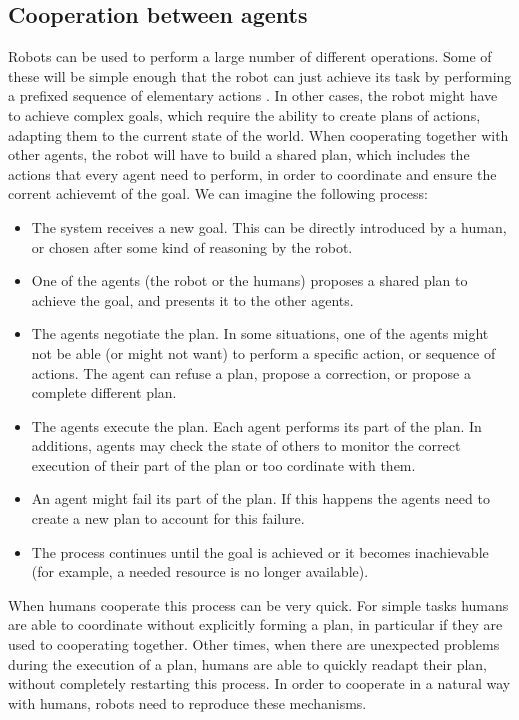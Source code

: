 \subsection{Cooperation between agents}
Robots can be used to perform a large number of different operations. Some of these will be simple enough that the robot can just achieve its task by performing a prefixed sequence of elementary actions . In other cases, the robot might have to  achieve complex goals, which require the ability to create plans of actions, adapting them to the current state of the world. When cooperating together with other agents, the robot will have to build a shared plan, which includes the actions that every agent need to perform, in order to coordinate and ensure the corrent achievemt of the goal. We can imagine the following process:
\begin{itemize}
	\item The system receives a new goal. This can be directly introduced by a human, or chosen after some kind of reasoning by the robot.
	\item One of the agents (the robot or the humans) proposes a shared plan to achieve the goal, and presents it to the other agents.
	\item The agents negotiate the plan. In some situations, one of the agents might not be able (or might not want) to perform a specific action, or sequence of actions. The agent can refuse a plan, propose a correction, or propose a complete different plan.
	\item The agents execute the plan. Each agent performs its part of the plan. In additions, agents may check the state of others to monitor the correct execution of their part of the plan or too cordinate with them.
	\item An agent might fail its part of the plan. If this happens the agents need to create a new plan to account for this failure.
 	\item The process continues until the goal is achieved or it becomes inachievable (for example, a needed resource is no longer available).
\end{itemize} 
When humans cooperate this process can be very quick. For simple tasks humans are able to coordinate without explicitly forming a plan, in particular if they are used to cooperating together. Other times, when there are unexpected problems during the execution of a plan, humans are able to quickly readapt their plan, without completely restarting this process. In order to cooperate in a natural way with humans, robots need to reproduce these mechanisms.


